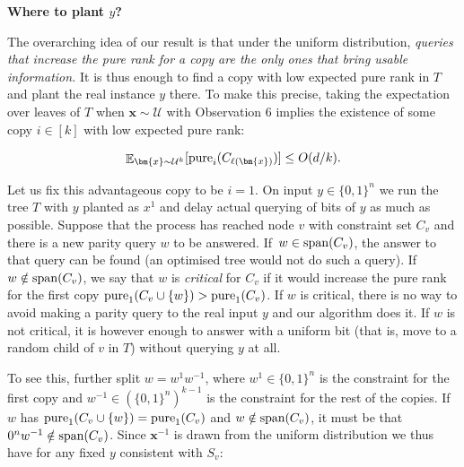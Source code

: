 \documentclass[10pt,a4paper]{article}
\begin{document}
\par\medskip\noindent\textbf{Where to plant $y$?}\par




The overarching idea of our result is that under the uniform distribution, \emph{queries that increase the pure rank for a copy are the only ones that bring usable information.} It is thus enough to find a copy with low expected pure rank in $T$ and plant the real instance $y$ there. To make this precise, taking the expectation over leaves of $T$ when $\bm{x}\sim\mathcal{U}$ with Observation 6 implies the existence of some copy $i\in[k]$ with low expected pure rank:\par


\[\begin{gathered}
\mathop{\mathbb{E}}\nolimits_{\bm{x}\sim\mathcal{U}^{k}}[\mathop{\textup{pure}}\nolimits_{i}(C_{\ell(\bm{x})})]\leq O(d/k).
\end{gathered}\]


Let us fix this advantageous copy to be $i=1$. On input $y\in\{0,1\}^{n}$ we run the tree $T$ with $y$ planted as $x^{1}$ and delay actual querying of bits of $y$ as much as possible. Suppose that the process has reached node $v$ with constraint set $C_{v}$ and there is a new parity query $w$ to be answered. If $w\in\textup{span}(C_{v})$, the answer to that query can be found (an optimised tree would not do such a query). If $w\notin\textup{span}(C_{v})$, we say that $w$ is \emph{critical} for $C_{v}$ if it would increase the pure rank for the first copy $\mathop{\textup{pure}}_{1}(C_{v}\cup\{w\})>\mathop{\textup{pure}}_{1}(C_{v})$. If $w$ is critical, there is no way to avoid making a parity query to the real input $y$ and our algorithm does it. If $w$ is not critical, it is however enough to answer with a uniform bit (that is, move to a random child of $v$ in $T$) without querying $y$ at all.\par




To see this, further split $w=w^{1}w^{-1}$, where $w^{1}\in\{0,1\}^{n}$ is the constraint for the first copy and $w^{-1}\in(\{0,1\}^{n})^{k-1}$ is the constraint for the rest of the copies. If $w$ has $\mathop{\textup{pure}}_{1}(C_{v}\cup\{w\})=\mathop{\textup{pure}}_{1}(C_{v})$ and $w\notin\textup{span}(C_{v})$, it must be that $0^{n}w^{-1}\notin\textup{span}(C_{v})$. Since $\bm{x}^{-1}$ is drawn from the uniform distribution we thus have for any fixed $y$ consistent with $S_{v}$:\par
\end{document}
